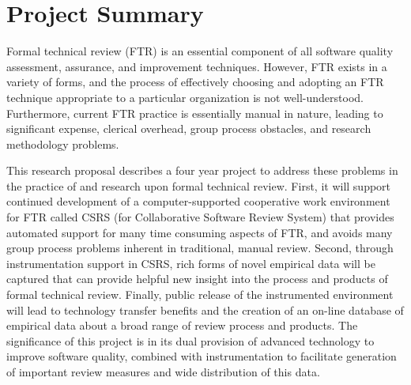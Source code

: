 
\section{Project Summary}

Formal technical review (FTR) is an essential component of all software
quality assessment, assurance, and improvement techniques.  However, FTR
exists in a variety of forms, and the process of effectively choosing and
adopting an FTR technique appropriate to a particular organization is not
well-understood.  Furthermore, current FTR practice is essentially manual
in nature, leading to significant expense, clerical overhead, group process
obstacles, and research methodology problems.

This research proposal describes a four year project to address these
problems in the practice of and research upon formal technical review.
First, it will support continued development of a computer-supported
cooperative work environment for FTR called CSRS (for Collaborative
Software Review System) that provides automated support for many time
consuming aspects of FTR, and avoids many group process problems inherent
in traditional, manual review.  Second, through instrumentation support in
CSRS, rich forms of novel empirical data will be captured that can provide
helpful new insight into the process and products of formal technical
review. Finally, public release of the instrumented environment will lead
to technology transfer benefits and the creation of an on-line database of
empirical data about a broad range of review process and products.  The
significance of this project is in its dual provision of advanced
technology to improve software quality, combined with instrumentation to
facilitate generation of important review measures and wide distribution
of this data.

